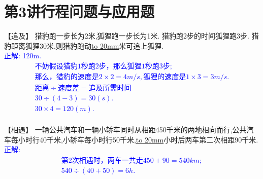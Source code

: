 \section{第3讲\quad 行程问题与应用题}

\item {
    【追及】
    猎豹跑一步长为2米,狐狸跑一步长为1米. 猎豹跑2步的时间狐狸跑3步. 猎豹距离狐狸30米,则猎豹跑动\underline{\hbox to 20mm{}}米可追上狐狸. 
    \ifshowSolution 
        \fangsong{}\textcolor{blue}{
            \\正解: 120m.\\
            \begin{gather*}
                不妨假设猎豹1秒跑2步，那么狐狸1秒跑3步;\\
                那么，猎豹的速度是 2\times 2 = 4m/s, 狐狸的速度是 1\times 3 = 3 m/s. \\
                距离\div 速度差 = 追及所需时间\\
                30\div (4-3) = 30(s). \\
                30 \times 4 = 120 (m).\\
            \end{gather*}
        }
    \else
        \vspace{1cm}
    \fi
}

\item {
    【相遇】
    一辆公共汽车和一辆小轿车同时从相距450千米的两地相向而行,公共汽车每小时行40千米,小轿车每小时行50千米,\underline{\hbox to 20mm{}}小时后两车第二次相距90千米. 
    \ifshowSolution 
        \fangsong{}\textcolor{blue}{
            \\正解: \\
            \begin{gather*}
                第2次相遇时，两车一共走 450+90=540 km;\\
                540\div (40+50) = 6h.\\
            \end{gather*}
        }
    \else
        \vspace{1cm}
    \fi
}

